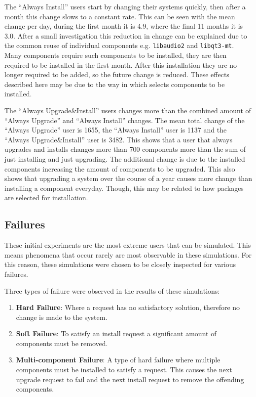 The ``Always Install'' users start by changing their systems quickly, then after a month this change slows to a constant rate.
This can be seen with the mean change per day, during the first month it is 4.9, where the final 11 months it is 3.0.
After a small investigation this reduction in change can be explained due to the common reuse of individual components e.g. \texttt{libaudio2} and \texttt{libqt3-mt}.
Many components require such components to be installed, they are then required to be installed in the first month.
After this installation they are no longer required to be added, so the future change is reduced. 
These effects described here may be due to the way in which \usermodel selects components to be installed.

The ``Always Upgrade\&Install'' users changes more than the combined amount of ``Always Upgrade'' and ``Always Install'' changes.
The mean total change of the ``Always Upgrade'' user is 1655, the ``Always Install'' user is 1137 and the ``Always Upgrade\&Install'' user is 3482.
This shows that a user that always upgrades and installs changes more than 700 components more than the sum of just installing and just upgrading.
The additional change is due to the installed components increasing the amount of components to be upgraded.
This also shows that upgrading a system over the course of a year causes more change than installing a component everyday.
Though, this may be related to how packages are selected for installation.

\subsection{Failures}
These initial experiments are the most extreme users that can be simulated.
This means phenomena that occur rarely are most observable in these simulations.
For this reason, these simulations were chosen to be closely inspected for various failures.

Three types of failure were observed in the results of these simulations:
\begin{enumerate}
  \item \textbf{Hard Failure}: Where a request has no satisfactory solution, therefore no change is made to the system.
  \item \textbf{Soft Failure}: To satisfy an install request a significant amount of components must be removed.
  \item \textbf{Multi-component Failure}: A type of hard failure where multiple components must be installed to satisfy a request. 
  This causes the next upgrade request to fail and the next install request to remove the offending components.
\end{enumerate}

